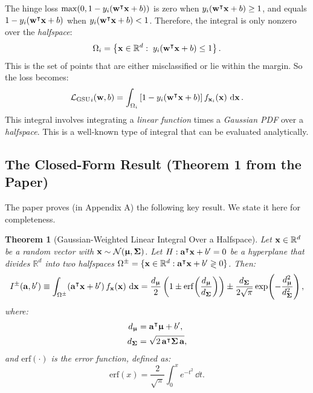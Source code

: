 \documentclass[11pt, letterpaper]{article}
\newcommand{\bSigma}{\vb{\Sigma}}
\newcommand{\bmu}{\boldsymbol{\upmu}}
\newcommand{\R}{\mathbb{R}}
\newcommand{\loss}{\mathcal{L}}
\newcommand{\Norm}{\mathcal{N}}
\newtheorem{theorem}{Theorem}[section]
\begin{document}
The hinge loss $\max(0, 1 - y_i(\vb{w}^{\intercal} \vb{x} + b))$ is zero when $y_i(\vb{w}^{\intercal} \vb{x} + b) \geq 1$, and equals $1 - y_i(\vb{w}^{\intercal} \vb{x} + b)$ when $y_i(\vb{w}^{\intercal} \vb{x} + b) < 1$. Therefore, the integral is only nonzero over the \emph{halfspace}:
\begin{equation}
    \Omega_i = \left\{ \vb{x} \in \R^d :\; y_i\!\left(\vb{w}^{\intercal} \vb{x} + b\right) \leq 1 \right\}.
\end{equation}
This is the set of points that are either misclassified or lie within the margin. So the loss becomes:
\begin{equation}\label{eq:loss_halfspace}
    {\loss_{\text{GSU}}}_{i}(\vb{w}, b) = \int_{\Omega_i} \left[1 - y_i\!\left(\vb{w}^{\intercal} \vb{x} + b\right)\right] f_{\vb{x}_i}(\vb{x})\, \dd{\vb{x}}.
\end{equation}
This integral involves integrating a \emph{linear function} times a \emph{Gaussian PDF} over a \emph{halfspace}. This is a well-known type of integral that can be evaluated analytically.

\subsection{The Closed-Form Result (Theorem 1 from the Paper)}

The paper proves (in Appendix A) the following key result. We state it here for completeness.

\begin{theorem}[Gaussian-Weighted Linear Integral Over a Halfspace]\label{thm:halfspace}
Let $\vb{x} \in \R^d$ be a random vector with $\vb{x} \sim \Norm(\bmu, \bSigma)$. Let $H: \vb{a}^{\intercal} \vb{x} + b' = 0$ be a hyperplane that divides $\R^d$ into two halfspaces $\Omega^{\pm} = \{\vb{x} \in \R^d : \vb{a}^{\intercal} \vb{x} + b' \gtrless 0\}$. Then:
\begin{equation}\label{eq:halfspace_integral}
    I^{\pm}(\vb{a}, b') \equiv \int_{\Omega^{\pm}} (\vb{a}^{\intercal} \vb{x} + b')\, f_{\vb{x}}(\vb{x})\, \dd{\vb{x}} = \frac{d_{\bmu}}{2}\left(1 \pm \mathrm{erf}\!\left(\frac{d_{\bmu}}{d_{\bSigma}}\right)\right) \pm \frac{d_{\bSigma}}{2\sqrt{\pi}} \exp\!\left(-\frac{d_{\bmu}^2}{d_{\bSigma}^2}\right),
\end{equation}
where:
\begin{align}
    d_{\bmu} &= \vb{a}^{\intercal} \bmu + b', \label{eq:d_mu}\\
    d_{\bSigma} &= \sqrt{2\, \vb{a}^{\intercal} \bSigma\, \vb{a}}, \label{eq:d_sigma}
\end{align}
and $\mathrm{erf}(\cdot)$ is the \emph{error function}, defined as:
\begin{equation}
    \mathrm{erf}(x) = \frac{2}{\sqrt{\pi}} \int_0^x e^{-t^2}\, \dd{t}.
\end{equation}
\end{theorem}
\end{document}
